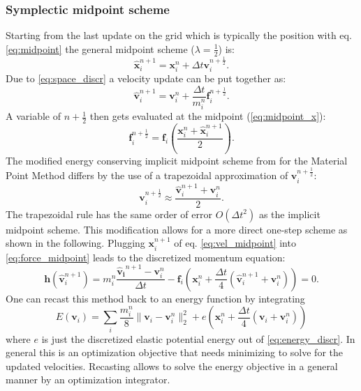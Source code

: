 \documentclass[m,times]{cgMA}
\begin{document}
\subsubsection{Symplectic midpoint scheme}
Starting from the last update on the grid which is typically the position with eq. \ref{eq:midpoint} the general midpoint scheme ($\lambda=\frac{1}{2}$) is:
\begin{equation}\label{eq:vel_midpoint}
  \boldsymbol{\hat{x}}_i^{n+1}   =\boldsymbol{x}_i^{n} + \Delta t \boldsymbol{v}_i^{n+\frac{1}{2}}.
\end{equation}
Due to \ref{eq:space_discr} a velocity update can be put together as:
\begin{equation}\label{eq:force_midpoint}
\boldsymbol{\hat{v}}^{n+1}_i
= \boldsymbol{v}^n_i+ \frac{\Delta t}{m_i^n}\boldsymbol{f}_i^{n+\frac{1}{2}}.
\end{equation}
A variable of $n+\frac{1}{2}$ then gets evaluated at the midpoint (\ref{eq:midpoint_x}):
\begin{equation}
  \boldsymbol{f}^{n+\frac{1}{2}}_i =  \boldsymbol{f}_i\left(\frac{\boldsymbol{x}_i^n + \boldsymbol{\hat{x}}_i^{n+1}}{2}\right).
\end{equation}
The modified energy conserving implicit midpoint scheme from \cite{GONZALEZ} for the Material Point Method differs by the use of a trapezoidal approximation of $\boldsymbol{v}_i^{n+\frac{1}{2}}$:
\begin{equation}\label{eq:trapezoidal}
  \boldsymbol{v}_i^{n+\frac{1}{2}} \approx \frac{\boldsymbol{\hat{v}}_i^{n+1} + \boldsymbol{v}_i^{n}}{2}.
\end{equation}
The trapezoidal rule has the same order of error $O(\Delta t^2)$ as the implicit midpoint scheme. This modification allows for a more direct one-step scheme as shown in the following. Plugging $\boldsymbol{x}_i^{n+1}$ of eq. \ref{eq:vel_midpoint} into \ref{eq:force_midpoint} leads to the discretized momentum equation:
\begin{equation}
  \boldsymbol{h}(\boldsymbol{\hat{v}}_i^{n+1}) = m_i^n \frac{\boldsymbol{\hat{v}_i}^{n+1}-\boldsymbol{v}_i^n}{\Delta t} - \boldsymbol{f}_i\left(\boldsymbol{x}_i^n + \frac{\Delta t}{4} (\boldsymbol{\hat{v}}_i^{n+1} + \boldsymbol{v}_i^{n})\right) = 0.
\end{equation}
One can recast this method back to an energy function by integrating
\begin{equation}
  E(\boldsymbol{v}_i) = \sum_i \frac{m_i^n}{8} \|\boldsymbol{v}_i - \boldsymbol{v}_i^n\|^2_2 + e(\boldsymbol{x}_i^n + \frac{\Delta t}{4}(\boldsymbol{v}_i + \boldsymbol{v}_i^n))
\end{equation}
where $e$ is just the discretized elastic potential energy out of \ref{eq:energy_discr}. In general this is an optimization objective that needs minimizing to solve for the updated velocities. Recasting allows to solve the energy objective in a general manner by an optimization integrator.
\end{document}
